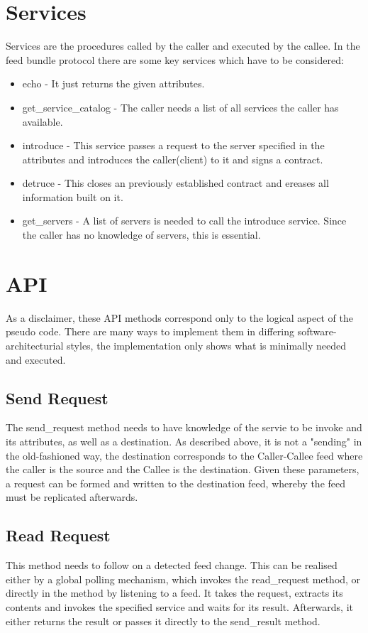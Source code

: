 \section{Services}
Services are the procedures called by the caller and executed by the callee. In the feed bundle protocol there are some key services which have to be considered:
\begin{itemize}
    \item echo - It just returns the given attributes.
    \item get\_service\_catalog - The caller needs a list of all services the caller has available.
    \item introduce - This service passes a request to the server specified in the attributes and introduces the caller(client) to it and signs a contract.
    \item detruce - This closes an previously established contract and ereases all information built on it.
    \item get\_servers - A list of servers is needed to call the introduce service. Since the caller has no knowledge of servers, this is essential.
\end{itemize}
\section{API}
As a disclaimer, these API methods correspond only to the logical aspect of the pseudo code. There are many ways to implement them in differing software-architecturial styles, the implementation only shows what is minimally needed and executed.
\subsection{Send Request}


The send\_request method needs to have knowledge of the servie to be invoke and its attributes, as well as a destination. As described above, it is not a "sending" in the old-fashioned way, the destination corresponds to the Caller-Callee feed where the caller is the source and the Callee is the destination. Given these parameters, a request can be formed and written to the destination feed, whereby the feed must be replicated afterwards. 
\subsection{Read Request}

This method needs to follow on a detected feed change. This can be realised either by a global polling mechanism, which invokes the read\_request method, or directly in the method by listening to a feed. It takes the request, extracts its contents and invokes the specified service and waits for its result. Afterwards, it either returns the result or passes it directly to the send\_result method.
